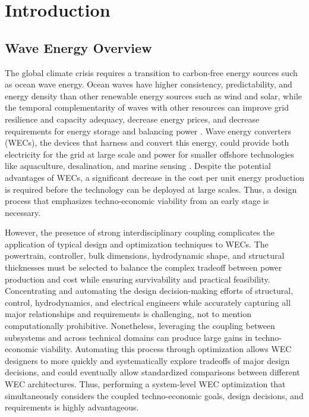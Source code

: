 \section{Introduction}
\label{intro}
\subsection{Wave Energy Overview}

The global climate crisis requires a transition to carbon-free energy sources such as ocean wave energy.
Ocean waves have higher consistency, predictability, and energy density than other renewable energy sources such as wind and solar, while the temporal complementarity of waves with other resources can improve grid resilience and capacity adequacy, decrease energy prices, and decrease requirements for energy storage and balancing power \cite{akdemir_opportunities_2023,bhattacharya_timing_2021,pennock_temporal_2022}.
Wave energy converters (WECs), the devices that harness and convert this energy, could provide both electricity for the grid at large scale and power for smaller offshore technologies like aquaculture, desalination, and marine sensing \cite{PBE}.
Despite the potential advantages of WECs, a significant decrease in the cost per unit energy production is required before the technology can be deployed at large scales. %
Thus, a design process that emphasizes techno-economic viability from an early stage is necessary.

However, the presence of strong interdisciplinary coupling complicates the application of typical design and optimization techniques to WECs.
The powertrain, controller, bulk dimensions, hydrodynamic shape, and structural thicknesses must be selected to balance the complex tradeoff between power production and cost while ensuring survivability and practical feasibility.
Concentrating and automating the design decision-making efforts of structural, control, hydrodynamics, and electrical engineers while accurately capturing all major relationships and requirements is challenging, not to mention computationally prohibitive.
Nonetheless, leveraging the coupling between subsystems and across technical domains can produce large gains in techno-economic viability.
Automating this process through optimization allows WEC designers to more quickly and systematically explore tradeoffs of major design decisions, and could eventually allow standardized comparisons between different WEC architectures.
Thus, performing a system-level WEC optimization that simultaneously considers the coupled techno-economic goals, design decisions, and requirements is highly advantageous.

